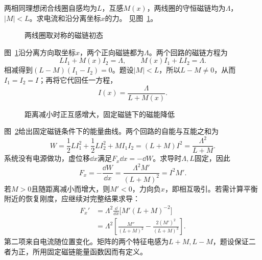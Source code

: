 \begin{exercise}[闭合双线圈的磁链约束]\label{ex:i3-h4}
两相同理想闭合线圈自感均为$L$，互感$M(x)$，两线圈的守恒磁链均为$\Lambda$，$|M|<L$。求电流和沿分离坐标$x$的力。 见图~\ref{fig:i3-h4-q}。
\end{exercise}

\begin{figure}[H]\centering
{}
\caption{两线圈取对称的磁链初态}\label{fig:i3-h4-q}
\end{figure}
\begin{solution}
图~\ref{fig:i3-h4-q}沿分离方向取坐标$x$，两个正向磁链都为$\Lambda$。两个回路的磁链方程为
\[
LI_1+M(x)I_2=\Lambda,\qquad
M(x)I_1+LI_2=\Lambda.
\]
相减得到$(L-M)(I_1-I_2)=0$。题设$|M|<L$，所以$L-M\ne0$，从而$I_1=I_2=I$；再将它代回任一方程，
\[
\boxed{I(x)=\frac{\Lambda}{L+M(x)}}.
\]
\begin{figure}[H]\centering
{}
\caption{距离减小时正互感增大，固定磁链下的磁能降低}\label{fig:i3-h4-s}
\end{figure}
图~\ref{fig:i3-h4-s}给出固定磁链条件下的能量曲线。两个回路的自能与互能之和为
\[
W=\frac12LI_1^2+\frac12LI_2^2+MI_1I_2
=(L+M)I^2=\frac{\Lambda^2}{L+M}.
\]
系统没有电源做功，虚位移$\dd x$满足$F_x\dd x=-\dd W$。求导时$\Lambda,L$固定，因此
\[
\boxed{F_x=-\frac{\dd W}{\dd x}
=\frac{\Lambda^2M'}{(L+M)^2}=I^2M'}.
\]
若$M>0$且随距离减小而增大，则$M'<0$，力向负$x$，即相互吸引。若需计算平衡附近的恢复刚度，应继续对完整结果求导：
\[
\begin{aligned}
F_x'&=\Lambda^2\frac{\dd}{\dd x}\big[M'(L+M)^{-2}\big]\\
&=\Lambda^2\left[\frac{M''}{(L+M)^2}
-\frac{2(M')^2}{(L+M)^3}\right].
\end{aligned}
\]
第二项来自电流随位置变化。矩阵的两个特征电感为$L+M,L-M$，题设保证二者为正，所用固定磁链能量函数因而有定义。
\end{solution}


